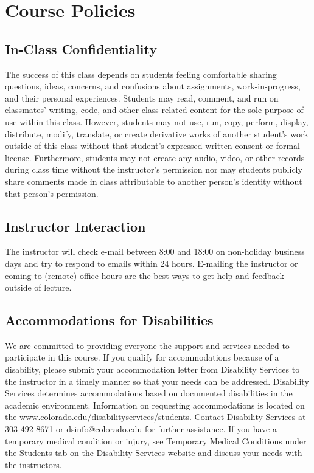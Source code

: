 \documentclass[10pt]{memoir}
\begin{document}
\clearpage


\section{\textbf{Course Policies}}


\subsection{In-Class Confidentiality}
The success of this class depends on students feeling comfortable sharing questions, ideas, concerns, and confusions about assignments, work-in-progress, and their personal experiences. Students may read, comment, and run on classmates' writing, code, and other class-related content for the sole purpose of use within this class. However, students may not use, run, copy, perform, display, distribute, modify, translate, or create derivative works of another student's work outside of this class without that student's expressed written consent or formal license. Furthermore, students may not create any audio, video, or other records during class time without the instructor's permission nor may students publicly share comments made in class attributable to another person's identity without that person's permission.

\subsection{Instructor Interaction}
The instructor will check e-mail between 8:00 and 18:00 on non-holiday business days and try to respond to emails within 24 hours. E-mailing the instructor or coming to (remote) office hours are the best ways to get help and feedback outside of lecture.

\subsection{Accommodations for Disabilities}
We are committed to providing everyone the support and services needed to participate in this course. If you qualify for accommodations because of a disability, please submit your accommodation letter from Disability Services to the instructor in a timely manner so that your needs can be addressed. Disability Services determines accommodations based on documented disabilities in the academic environment. Information on requesting accommodations is located on the \href{Disability Services website}{www.colorado.edu/disabilityservices/students}. Contact Disability Services at 303-492-8671 or \href{mailto:dsinfo@colorado.edu}{dsinfo@colorado.edu} for further assistance. If you have a temporary medical condition or injury, see Temporary Medical Conditions under the Students tab on the Disability Services website and discuss your needs with the instructors.
\end{document}
